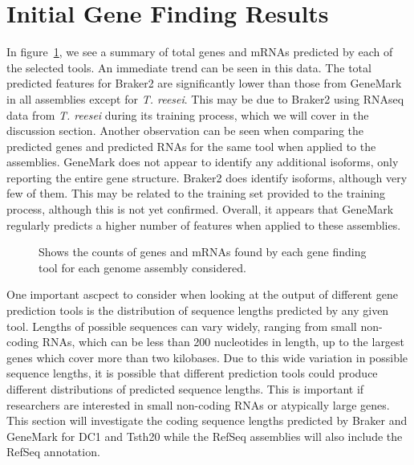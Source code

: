 \section{Initial Gene Finding Results} 

In figure~\ref{genecounts}, we see a summary of total genes and mRNAs
predicted by each of the selected tools. An immediate trend can be
seen in this data. The total predicted features for Braker2 are
significantly lower than those from GeneMark in all assemblies except
for \textit{T. reesei}. This may be due to Braker2 using RNAseq data
from \textit{T. reesei} during its training process, which we will
cover in the discussion section. Another observation can be seen when
comparing the predicted genes and predicted RNAs for the same tool
when applied to the assemblies. GeneMark does not appear to identify
any additional isoforms, only reporting the entire gene
structure. Braker2 does identify isoforms, although very few of
them. This may be related to the training set provided to the training
process, although this is not yet confirmed. Overall, it appears that
GeneMark regularly predicts a higher number of features when applied
to these assemblies.

\begin{figure}
  \caption{Shows the counts of genes and mRNAs found by each gene
    finding tool for each genome assembly considered.}
  \label{genecounts}
\end{figure}

One important ascpect to consider when looking at the output of
different gene prediction tools is the distribution of sequence
lengths predicted by any given tool. Lengths of possible sequences can
vary widely, ranging from small non-coding RNAs, which can be less
than 200 nucleotides in length, up to the largest genes which cover
more than two kilobases. Due to this wide variation in possible
sequence lengths, it is possible that different prediction tools could
produce different distributions of predicted sequence lengths. This is
important if researchers are interested in small non-coding RNAs or
atypically large genes. This section will investigate the coding
sequence lengths predicted by Braker and GeneMark for DC1 and Tsth20
while the RefSeq assemblies will also include the RefSeq annotation.

